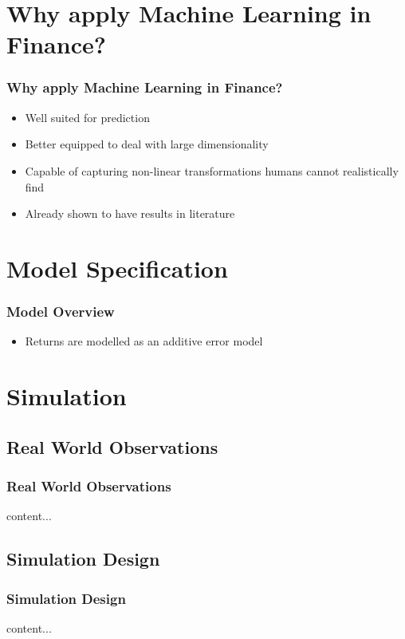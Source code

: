 \documentclass{beamer}
\begin{document}
\section{Why apply Machine Learning in Finance?}

\begin{frame}
\frametitle{Why apply Machine Learning in Finance?}
\begin{itemize}
	\item Well suited for prediction
	\item Better equipped to deal with large dimensionality
	\item Capable of capturing non-linear transformations humans cannot realistically find
	\item Already shown to have results in literature
\end{itemize}
\end{frame}

\section{Model Specification}

\begin{frame}
\frametitle{Model Overview}
\begin{itemize}
	\item Returns are modelled as an additive error model
	
\end{itemize}
\end{frame}

\section{Simulation}

\subsection{Real World Observations}
\begin{frame}
\frametitle{Real World Observations}
	content...
\end{frame}

\subsection{Simulation Design}
\begin{frame}
\frametitle{Simulation Design}
content...
\end{frame}
\end{document}
